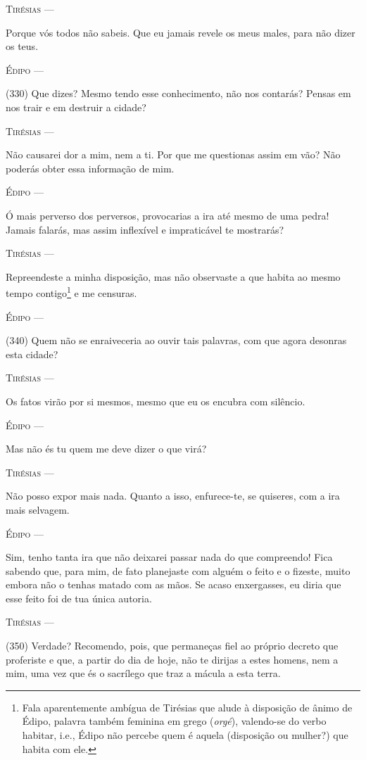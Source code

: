 \textsc{Tirésias} ---

Porque vós todos não sabeis. Que eu jamais revele os meus males, para
não dizer os teus.

\textsc{Édipo} ---

(330) Que dizes? Mesmo tendo esse conhecimento, não nos contarás? Pensas
em nos trair e em destruir a cidade?

\textsc{Tirésias} ---

Não causarei dor a mim, nem a ti. Por que me questionas assim em vão?
Não poderás obter essa informação de mim.

\textsc{Édipo} ---

Ó mais perverso dos perversos, provocarias a ira até mesmo de uma pedra!
Jamais falarás, mas assim inflexível e impraticável te mostrarás?

\textsc{Tirésias} ---

Repreendeste a minha disposição, mas não observaste a que habita ao
mesmo tempo contigo\footnote{Fala aparentemente ambígua de Tirésias que
  alude à disposição de ânimo de Édipo, palavra também feminina em grego
  (\emph{orgé}), valendo-se do verbo habitar, i.e., Édipo não percebe
  quem é aquela (disposição ou mulher?) que habita com ele.} e me
censuras.

\textsc{Édipo} ---

(340) Quem não se enraiveceria ao ouvir tais palavras, com que agora
desonras esta cidade?

\textsc{Tirésias} ---

Os fatos virão por si mesmos, mesmo que eu os encubra com silêncio.

\textsc{Édipo} ---

Mas não és tu quem me deve dizer o que virá?

\textsc{Tirésias} ---

Não posso expor mais nada. Quanto a isso, enfurece-te, se quiseres, com
a ira mais selvagem.

\textsc{Édipo} ---

Sim, tenho tanta ira que não deixarei passar nada do que compreendo!
Fica sabendo que, para mim, de fato planejaste com alguém o feito e o
fizeste, muito embora não o tenhas matado com as mãos. Se acaso
enxergasses, eu diria que esse feito foi de tua única autoria.

\textsc{Tirésias} ---

(350) Verdade? Recomendo, pois, que permaneças fiel ao próprio decreto
que proferiste e que, a partir do dia de hoje, não te dirijas a estes
homens, nem a mim, uma vez que és o sacrílego que traz a mácula a esta
terra.

